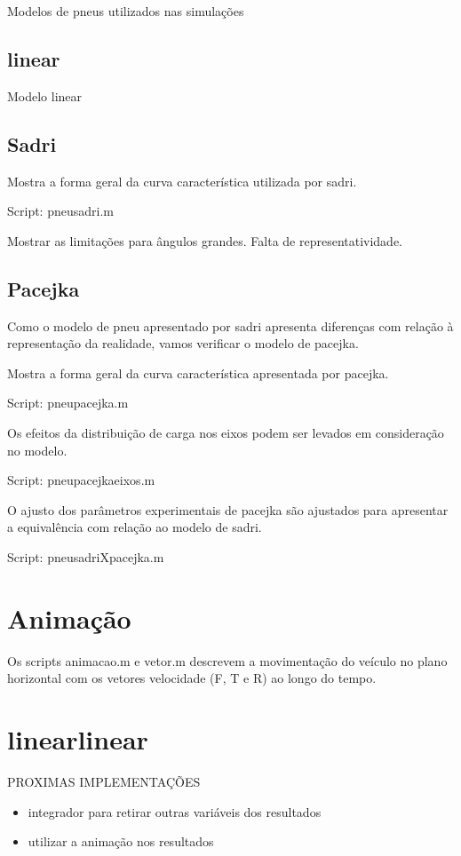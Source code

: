 \documentclass[sublist]{fei}
\begin{document}
Modelos de pneus utilizados nas simulações

\section{linear}

Modelo linear 

\section{Sadri}

Mostra a forma geral da curva característica utilizada por sadri.

Script: pneusadri.m

Mostrar as limitações para ângulos grandes. Falta de representatividade.

\section{Pacejka}

Como o modelo de pneu apresentado por sadri apresenta diferenças com relação à representação da realidade, vamos verificar o modelo de pacejka.

Mostra a forma geral da curva característica apresentada por pacejka.

Script: pneupacejka.m

Os efeitos da distribuição de carga nos eixos podem ser levados em consideração no modelo. 

Script: pneupacejkaeixos.m

O ajusto dos parâmetros experimentais de pacejka são ajustados para apresentar a equivalência com relação ao modelo de sadri.

Script: pneusadriXpacejka.m

\chapter{Animação}

Os scripts animacao.m e vetor.m descrevem a movimentação do veículo no plano horizontal com os vetores velocidade (F, T e R) ao longo do tempo.


\chapter{linearlinear} 

PROXIMAS IMPLEMENTAÇÕES

\begin{itemize}
\item integrador para retirar outras variáveis dos resultados
\item utilizar a animação nos resultados
\end{itemize}
\end{document}
